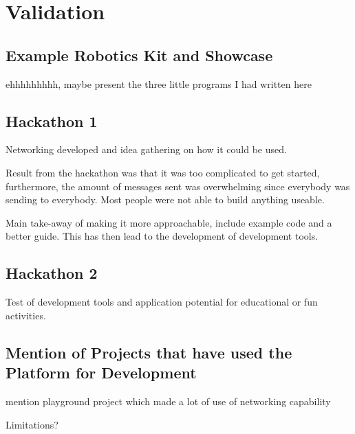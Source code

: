 \section{\label{sec:res_validation}Validation}

\subsection{\label{sec:res_examplekit}Example Robotics Kit and Showcase}

ehhhhhhhhh, maybe present the three little programs I had written here

\subsection{\label{sec:res_hackathon1}Hackathon 1}

Networking developed and idea gathering on how it could be used.

Result from the hackathon was that it was too complicated to get started, furthermore, the amount of messages sent was overwhelming since everybody was sending to everybody. Most people were not able to build anything useable. 

Main take-away of making it more approachable, include example code and a better guide. This has then lead to the development of development tools.

\subsection{\label{sec:res_hackathon2}Hackathon 2}

Test of development tools and application potential for educational or fun activities.

\subsection{\label{sec:res_honourablementions}Mention of Projects that have used the Platform for Development}

mention playground project which made a lot of use of networking capability

Limitations?
